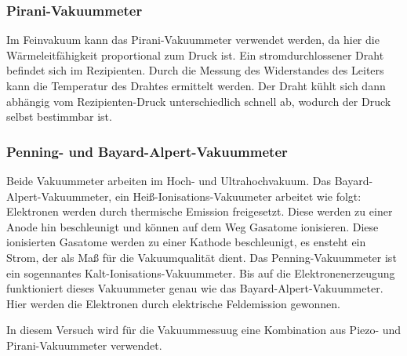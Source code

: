         \subsubsection{Pirani-Vakuummeter}
            Im Feinvakuum kann das Pirani-Vakuummeter verwendet werden, da hier die Wärmeleitfähigkeit proportional zum Druck ist.
            Ein stromdurchlossener Draht befindet sich im Rezipienten.
            Durch die Messung des Widerstandes des Leiters kann die Temperatur des Drahtes ermittelt werden.
            Der Draht kühlt sich dann abhängig vom Rezipienten-Druck unterschiedlich schnell ab, wodurch der Druck selbst bestimmbar ist.

        \subsubsection{Penning- und Bayard-Alpert-Vakuummeter}
            Beide Vakuummeter arbeiten im Hoch- und Ultrahochvakuum.
            Das Bayard-Alpert-Vakuummeter, ein Heiß-Ionisations-Vakuumeter arbeitet wie folgt:\\
            Elektronen werden durch thermische Emission freigesetzt.
            Diese werden zu einer Anode hin beschleunigt und können auf dem Weg Gasatome ionisieren.
            Diese ionisierten Gasatome werden zu einer Kathode beschleunigt, es ensteht ein Strom, der als Maß für die Vakuumqualität dient.
            \noindent
            Das Penning-Vakuummeter ist ein sogennantes Kalt-Ionisations-Vakuummeter.
            Bis auf die Elektronenerzeugung funktioniert dieses Vakuummeter genau wie das Bayard-Alpert-Vakuummeter.
            Hier werden die Elektronen durch elektrische Feldemission gewonnen.

        \noindent
        In diesem Versuch wird für die Vakuummessuug eine Kombination aus Piezo- und Pirani-Vakuummeter verwendet.
